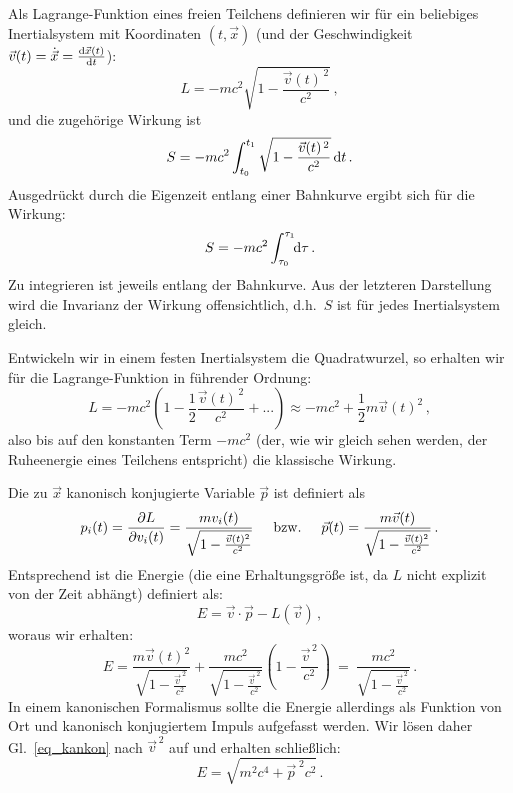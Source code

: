 Als Lagrange-Funktion eines freien Teilchens
definieren wir f\"ur ein beliebiges Inertialsystem
mit Koordinaten $(t,\vec{x})$ (und der Geschwindigkeit
$\vec{v}(t) = \dot{\vec{x}}= \frac{{\rm d}\vec{x}(t)}{{\rm d}t}$):
\begin{equation}
           L = - mc^2 \sqrt{1 - \frac{\vec{v}(t)^{\,2}}{c^2}} \, ,
\end{equation} 
und die zugeh\"orige Wirkung ist
\begin{equation}
        S =  - mc^2 \int_{t_0}^{t_1}
        \sqrt{1 - \frac{\vec{v}(t)^{\,2}}{c^2}} \, {\rm d}t \, . 
\end{equation}
Ausgedr\"uckt durch die Eigenzeit entlang einer
Bahnkurve ergibt sich f\"ur die Wirkung:
\begin{equation}
        S = -mc^2 \int_{\tau_0}^{\tau_1} \!\! {\rm d}\tau \, .
\end{equation}
Zu integrieren ist jeweils 
entlang der Bahnkurve. Aus der letzteren Darstellung
wird die Invarianz der Wirkung offensichtlich, d.h.\ $S$ ist
f\"ur jedes Inertialsystem gleich. 

Entwickeln wir in einem festen Inertialsystem die
Quadratwurzel, so erhalten wir f\"ur die Lagrange-Funktion 
in f\"uhrender Ordnung:
\begin{equation}
    L = - mc^2 \left( 1 - \frac{1}{2} \frac{\vec{v}(t)^{\,2}}{c^2} + ... \right)
       \approx - mc^2 + \frac{1}{2} m \vec{v}(t)^2  \, ,    
\end{equation}
also bis auf den konstanten Term $-mc^2$ (der, wie wir gleich
sehen werden, der Ruheenergie eines Teilchens entspricht)
die klassische Wirkung.

Die zu $\vec{x}$ kanonisch
konjugierte Variable $\vec{p}$ ist definiert als
\begin{equation}
\label{eq_kankon}
         p_i(t) = \frac{\partial L}{\partial v_i(t)} =
         \frac{mv_i(t)}{\sqrt{1- \frac{\vec{v}(t)^2}{c^2}}}
         \hspace{0.5cm} {\rm bzw.} \hspace{0.5cm}
         \vec{p}(t) =  \frac{m\vec{v}(t)}{\sqrt{1- \frac{\vec{v}(t)^2}{c^2}}} \, .
\end{equation} 
Entsprechend ist die Energie (die eine Erhaltungsgr\"o\ss e
ist, da $L$ nicht explizit von der Zeit abh\"angt) definiert als:
\begin{equation}
    E = \vec{v}\cdot \vec{p} - L(\vec{v})  \, ,
\end{equation}
woraus wir erhalten:
\begin{equation}
   E = \frac{m \vec{v}(t)^2}{\sqrt{1 - \frac{\vec{v}^{\,2}}{c^2}}} +
     \frac{mc^2}{\sqrt{1 - \frac{\vec{v}^{\,2}}{c^2}}} \left(1 -
     \frac{\vec{v}^{\,2}}{c^2} \right)  ~= ~ 
     \frac{mc^2}{\sqrt{1 - \frac{\vec{v}^{\,2}}{c^2}}}  \, . 
\end{equation}
In einem kanonischen Formalismus sollte die Energie
allerdings als Funktion von Ort und kanonisch 
konjugiertem Impuls aufgefasst werden. Wir l\"osen
daher Gl.\ \ref{eq_kankon} nach $\vec{v}^{\,2}$ auf
und erhalten schlie\ss lich:
\begin{equation}
        E = \sqrt{m^2c^4 + \vec{p}^{\; 2}c^2}   \, .
\end{equation}


